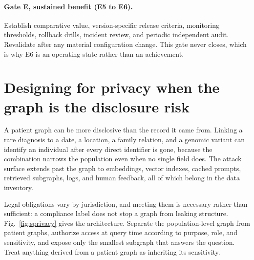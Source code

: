 \documentclass[10pt,a4paper]{article}
\begin{document}
\paragraph{Gate E, sustained benefit (E5 to E6).}
Establish comparative value, version-specific release criteria, monitoring thresholds, rollback
drills, incident review, and periodic independent audit. Revalidate after any material configuration
change. This gate never closes, which is why E6 is an operating state rather than an achievement.

\section{Designing for privacy when the graph is the disclosure risk}
\label{s:privacy}

A patient graph can be more disclosive than the record it came from. Linking a rare diagnosis to a
date, a location, a family relation, and a genomic variant can identify an individual after every
direct identifier is gone, because the combination narrows the population even when no single field
does. The attack surface extends past the graph to embeddings, vector indexes, cached prompts,
retrieved subgraphs, logs, and human feedback, all of which belong in the data inventory.

Legal obligations vary by jurisdiction, and meeting them is necessary rather than sufficient: a
compliance label does not stop a graph from leaking structure. Fig.~\ref{fig:sprivacy} gives the
architecture. Separate the population-level graph from patient graphs, authorize access at query time
according to purpose, role, and sensitivity, and expose only the smallest subgraph that answers the
question. Treat anything derived from a patient graph as inheriting its sensitivity.
\end{document}
